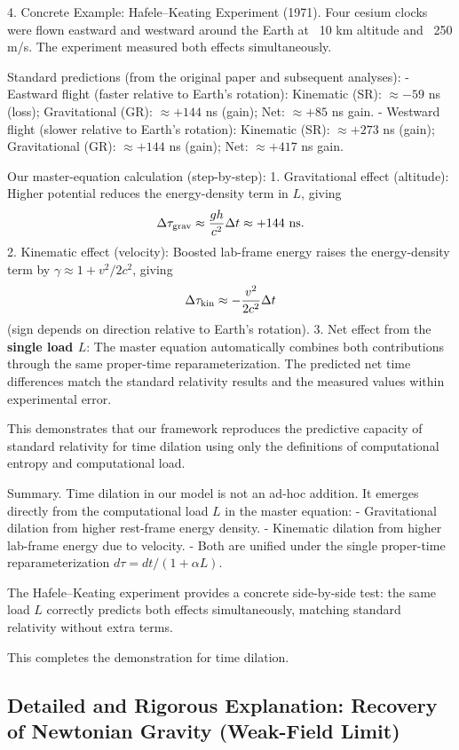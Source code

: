 \documentclass[reprint,amsmath,amssymb,aps,prd,preprintnumbers,superscriptaddress,longbibliography,10pt]{revtex4-2}
\begin{document}
4. Concrete Example: Hafele–Keating Experiment (1971). Four cesium clocks were flown eastward and westward around the Earth at ~10 km altitude and ~250 m/s. The experiment measured both effects simultaneously.

Standard predictions (from the original paper and subsequent analyses):
- Eastward flight (faster relative to Earth’s rotation): Kinematic (SR): \(\approx -59\) ns (loss); Gravitational (GR): \(\approx +144\) ns (gain); Net: \(\approx +85\) ns gain.
- Westward flight (slower relative to Earth’s rotation): Kinematic (SR): \(\approx +273\) ns (gain); Gravitational (GR): \(\approx +144\) ns (gain); Net: \(\approx +417\) ns gain.

Our master-equation calculation (step-by-step):
1. Gravitational effect (altitude): Higher potential reduces the energy-density term in \(L\), giving
\[
\Delta \tau_{\rm grav} \approx \frac{gh}{c^2} \Delta t \approx +144 \text{ ns}.
\]
2. Kinematic effect (velocity): Boosted lab-frame energy raises the energy-density term by \(\gamma \approx 1 + v^2/2c^2\), giving
\[
\Delta \tau_{\rm kin} \approx -\frac{v^2}{2c^2} \Delta t
\]
(sign depends on direction relative to Earth’s rotation).
3. Net effect from the \textbf{single load \(L\)}: The master equation automatically combines both contributions through the same proper-time reparameterization. The predicted net time differences match the standard relativity results and the measured values within experimental error.

This demonstrates that our framework reproduces the predictive capacity of standard relativity for time dilation using only the definitions of computational entropy and computational load.

Summary. Time dilation in our model is not an ad-hoc addition. It emerges directly from the computational load \(L\) in the master equation:
- Gravitational dilation from higher rest-frame energy density.
- Kinematic dilation from higher lab-frame energy due to velocity.
- Both are unified under the single proper-time reparameterization \(d\tau = dt / (1 + \alpha L)\).

The Hafele–Keating experiment provides a concrete side-by-side test: the same load \(L\) correctly predicts both effects simultaneously, matching standard relativity without extra terms.

This completes the demonstration for time dilation.

\subsection{Detailed and Rigorous Explanation: Recovery of Newtonian Gravity (Weak-Field Limit)}
\end{document}
